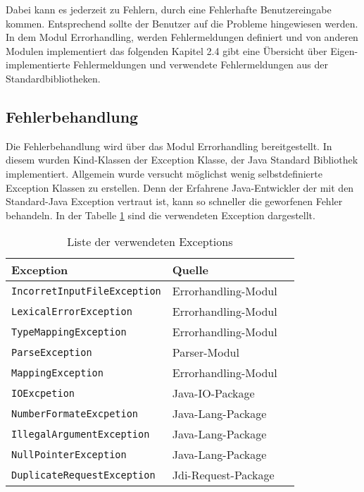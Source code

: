 Dabei kann es jederzeit zu Fehlern, durch eine Fehlerhafte Benutzereingabe kommen.
Entsprechend sollte der Benutzer auf die Probleme hingewiesen werden.
In dem Modul Errorhandling, werden Fehlermeldungen definiert und von anderen Modulen implementiert das folgenden Kapitel 2.4 gibt eine Übersicht über Eigen-implementierte Fehlermeldungen und verwendete Fehlermeldungen aus der Standardbibliotheken.

\pagebreak

\subsection{Fehlerbehandlung}
Die Fehlerbehandlung wird über das Modul Errorhandling bereitgestellt.
In diesem wurden Kind-Klassen der Exception Klasse, der Java Standard Bibliothek implementiert.
Allgemein wurde versucht möglichst wenig selbstdefinierte Exception Klassen zu erstellen.
Denn der Erfahrene Java-Entwickler der mit den Standard-Java Exception vertraut ist, kann so schneller die geworfenen Fehler behandeln. In der Tabelle \ref{tab:exceptiontabelle} sind die verwendeten Exception dargestellt.

\begin{table}[h]
	\centering
	
	\label{tab:exceptiontabelle}
\begin{tabular}[h]{|l|l|l|}
	\hline
	\textbf{Exception} & \textbf{Quelle}  \\
	\hline
	\verb+IncorretInputFileException+ & Errorhandling-Modul  \\
	\hline
	\verb+LexicalErrorException+ & Errorhandling-Modul  \\
	\hline
	\verb+TypeMappingException+ & Errorhandling-Modul \\
	\hline
	\verb+ParseException+ & Parser-Modul \\
	\hline
	\verb+MappingException+ & Errorhandling-Modul \\
	\hline
	\verb+IOExcpetion+ & Java-IO-Package \\
	\hline
	\verb+NumberFormateExcpetion+ & Java-Lang-Package \\
	\hline
	\verb+IllegalArgumentException+ & Java-Lang-Package \\
	\hline
	\verb+NullPointerException+ & Java-Lang-Package \\
	\hline
	\verb+DuplicateRequestException+ & Jdi-Request-Package \\
	\hline
	
\end{tabular}
\caption{Liste der verwendeten Exceptions}
\end{table}

